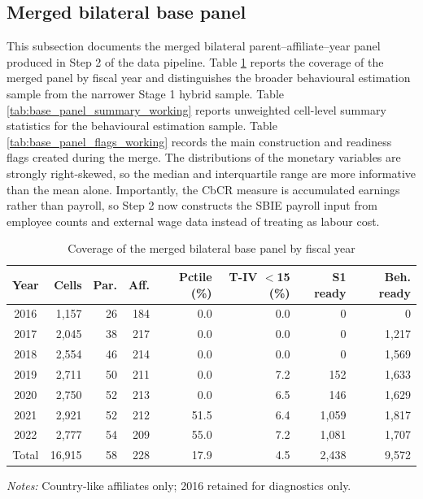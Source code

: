 \subsection{Merged bilateral base panel}\label{sec:base_panel_appendix}

This subsection documents the merged bilateral parent--affiliate--year panel produced in Step 2 of the data pipeline. Table \ref{tab:base_panel_coverage_working} reports the coverage of the merged panel by fiscal year and distinguishes the broader behavioural estimation sample from the narrower Stage 1 hybrid sample. Table \ref{tab:base_panel_summary_working} reports unweighted cell-level summary statistics for the behavioural estimation sample. Table \ref{tab:base_panel_flags_working} records the main construction and readiness flags created during the merge. The distributions of the monetary variables are strongly right-skewed, so the median and interquartile range are more informative than the mean alone. Importantly, the CbCR  measure is accumulated earnings rather than payroll, so Step 2 now constructs the SBIE payroll input from employee counts and external wage data instead of treating  as labour cost.

\begin{table}[H]
\centering
\footnotesize
\setlength{\tabcolsep}{3pt}
\caption{Coverage of the merged bilateral base panel by fiscal year}
\label{tab:base_panel_coverage_working}
\begin{tabular}{@{}crrrrrrr@{}}
\toprule
Year & Cells & Par. & Aff. & Pctile (\%) & T-IV $<$15 (\%) & S1 ready & Beh. ready \\
\midrule
2016 & 1,157 & 26 & 184 & 0.0 & 0.0 & 0 & 0 \\
2017 & 2,045 & 38 & 217 & 0.0 & 0.0 & 0 & 1,217 \\
2018 & 2,554 & 46 & 214 & 0.0 & 0.0 & 0 & 1,569 \\
2019 & 2,711 & 50 & 211 & 0.0 & 7.2 & 152 & 1,633 \\
2020 & 2,750 & 52 & 213 & 0.0 & 6.5 & 146 & 1,629 \\
2021 & 2,921 & 52 & 212 & 51.5 & 6.4 & 1,059 & 1,817 \\
2022 & 2,777 & 54 & 209 & 55.0 & 7.2 & 1,081 & 1,707 \\
\midrule
Total & 16,915 & 58 & 228 & 17.9 & 4.5 & 2,438 & 9,572 \\
\bottomrule
\end{tabular}
\vspace{0.35em}
\noindent\begin{minipage}{\textwidth}
\footnotesize\raggedright\textit{Notes:} Country-like affiliates only; 2016 retained for diagnostics only.
\end{minipage}
\end{table}

